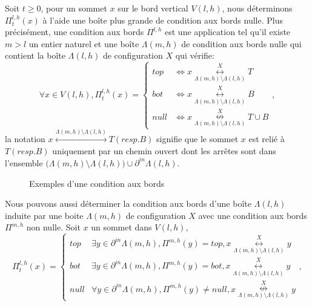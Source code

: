 \documentclass[titlepage,a4paper,12pt]{article}
\newcounter{cor}
\begin{document}
Soit $t\geqslant 0$, pour un sommet $x$ sur le bord vertical $V(l,h)$, nous déterminons $\Pi^{l,h}_t(x)$ à l'aide une boîte plus grande de condition aux bords nulle. Plus précisément, une condition aux bords $\Pi^{l,h}$ est une application tel qu'il existe $m>l$ un entier naturel et une boîte $\Lambda(m,h)$ de condition aux bords nulle qui contient la boîte $\Lambda(l,h)$ de configuration $X$ qui vérifie:
$$\forall x \in V(l,h),\Pi^{l,h}_t(x)=\left\lbrace \begin{array}{cl}
top & \Leftrightarrow x\overset{X}{\underset{\Lambda(m,h) \setminus \Lambda(l,h)}{\longleftrightarrow}} T\\
bot & \Leftrightarrow x\overset{X}{\underset{\Lambda(m,h) \setminus \Lambda(l,h)}{\longleftrightarrow}} B\\
null & \Leftrightarrow x\overset{X}{\underset{\Lambda(m,h) \setminus \Lambda(l,h)}{\nleftrightarrow}} T\cup B 
\end{array} \right.,
$$
la notation $x\overset{\Lambda(m,h) \setminus \Lambda(l,h)}{\longleftrightarrow} T(resp. B)$ signifie que le sommet $x$ est relié à $T(resp. B)$ uniquement par un chemin ouvert dont les arrêtes sont dans l'ensemble $\big(\Lambda(m,h) \setminus \Lambda(l,h)\big) \cup \partial^{in} \Lambda(l,h)$. 

\begin{figure}[h]
\center
{}
\caption{Exemples d'une condition aux bords}
\end{figure}

Nous pouvons aussi déterminer la condition aux bords d'une boîte $\Lambda(l,h)$ induite par une boite $\Lambda(m,h)$ de configuration $X$ avec une condition aux bords $\Pi^{m,h}$ non nulle. Soit $x$ un sommet dans $V(l,h)$, 
$$\Pi^{l,h}_t(x)=\left\lbrace \begin{array}{cl}
top & \exists y \in \partial^{in}\Lambda(m,h), \Pi^{m,h}(y) = top, x\overset{X}{\underset{\Lambda(m,h) \setminus \Lambda(l,h)}{\longleftrightarrow}} y\\
bot & \exists y \in \partial^{in}\Lambda(m,h), \Pi^{m,h}(y) = bot, x\overset{X}{\underset{\Lambda(m,h) \setminus \Lambda(l,h)}{\longleftrightarrow}} y\\
null & \forall y \in \partial^{in}\Lambda(m,h), \Pi^{m,h}(y) \neq null, x\overset{X}{\underset{\Lambda(m,h) \setminus \Lambda(l,h)}{\nleftrightarrow}} y
\end{array} \right.,
$$
\end{document}
